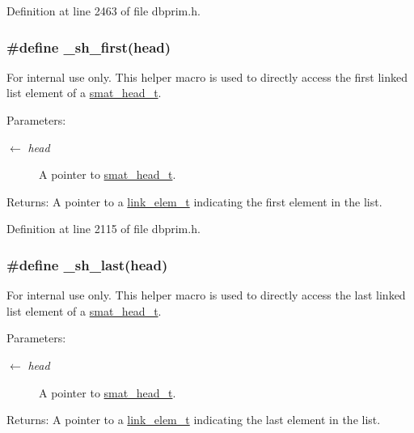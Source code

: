 Definition at line 2463 of file dbprim.h.\hypertarget{group__dbprim__smat_ga48}{
\subsubsection[\_\-sh\_\-first]{\setlength{\rightskip}{0pt plus 5cm}\#define \_\-sh\_\-first(head)}}
\label{group__dbprim__smat_ga48}


\begin{Desc}
\item[For internal use only.]
This helper macro is used to directly access the first linked list element of a \hyperlink{group__dbprim__smat_ga1}{smat\_\-head\_\-t}.

\begin{Desc}
\item[Parameters:]
\begin{description}
\item[\mbox{$\leftarrow$} {\em head}]A pointer to \hyperlink{group__dbprim__smat_ga1}{smat\_\-head\_\-t}.\end{description}
\end{Desc}
\begin{Desc}
\item[Returns:]A pointer to a \hyperlink{group__dbprim__link_ga1}{link\_\-elem\_\-t} indicating the first element in the list.\end{Desc}
\end{Desc}


Definition at line 2115 of file dbprim.h.\hypertarget{group__dbprim__smat_ga50}{
\subsubsection[\_\-sh\_\-last]{\setlength{\rightskip}{0pt plus 5cm}\#define \_\-sh\_\-last(head)}}
\label{group__dbprim__smat_ga50}


\begin{Desc}
\item[For internal use only.]
This helper macro is used to directly access the last linked list element of a \hyperlink{group__dbprim__smat_ga1}{smat\_\-head\_\-t}.

\begin{Desc}
\item[Parameters:]
\begin{description}
\item[\mbox{$\leftarrow$} {\em head}]A pointer to \hyperlink{group__dbprim__smat_ga1}{smat\_\-head\_\-t}.\end{description}
\end{Desc}
\begin{Desc}
\item[Returns:]A pointer to a \hyperlink{group__dbprim__link_ga1}{link\_\-elem\_\-t} indicating the last element in the list.\end{Desc}
\end{Desc}


